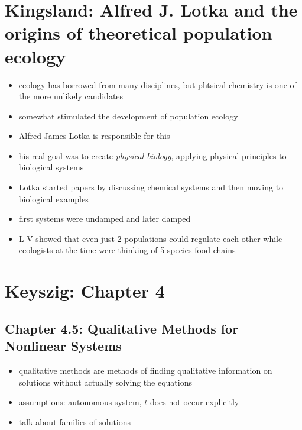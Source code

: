 \documentclass[a4paper,reqno,11pt]{article}
\begin{document}

\section{Kingsland: Alfred J. Lotka and the origins of theoretical population
ecology}

\begin{itemize}
    \item ecology has borrowed from many disciplines, but phtsical chemistry is
        one of the more unlikely candidates
    \item somewhat stimulated the development of population ecology
    \item Alfred James Lotka is responsible for this
    \item his real goal was to create \textit{physical biology}, applying
        physical principles to biological systems
    \item Lotka started papers by discussing chemical systems and then moving
        to biological examples
    \item first systems were undamped and later damped 
    \item L-V showed that even just 2 populations could regulate each other
        while ecologists at the time were thinking of 5 species food chains
\end{itemize}


\section{Keyszig: Chapter 4}

\subsection{Chapter 4.5: Qualitative Methods for Nonlinear Systems}

\begin{itemize}
    \item qualitative methods are methods of finding qualitative information on
        solutions without actually solving the equations
    \item assumptions: autonomous system, $t$ does not occur explicitly
    \item talk about families of solutions
\end{itemize}
\end{document}
